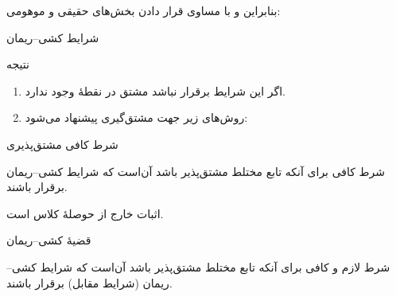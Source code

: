 \begin{EMproof}
بنابراین
و با مساوی قرار دادن بخش‌های حقیقی و موهومی:

\end{EMproof}


\begin{EMimportant}{شرایط کشی--ریمان}


\end{EMimportant}

\begin{EMremark}{نتیجه}

\begin{enumerate}
\def\labelenumi{\arabic{enumi}.}
\tightlist
\item
  اگر این شرایط برقرار نباشد مشتق در نقطهٔ  وجود ندارد.
\item
  روش‌های زیر جهت مشتق‌گیری پیشنهاد می‌شود:
\end{enumerate}

\end{EMremark}

\begin{EMtheorem}{شرط کافی مشتق‌پذیری}

شرط کافی برای آنکه تابع مختلط  مشتق‌پذیر باشد آن‌است که شرایط کشی--ریمان برقرار باشند.

اثبات خارج از حوصلهٔ کلاس است.

\end{EMtheorem}

\begin{EMtheorem}{قضیهٔ کشی--ریمان}

شرط لازم و کافی برای آنکه تابع مختلط  مشتق‌پذیر باشد آن‌است که شرایط کشی--ریمان (شرایط مقابل) برقرار باشند.

\end{EMtheorem}


